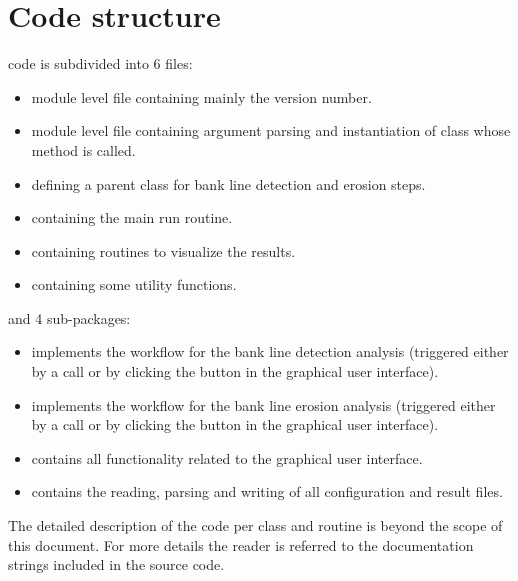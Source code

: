 \chapter{Code structure}

\dfastbe code is subdivided into 6 files:

\begin{itemize}
	\item {} module level file containing mainly the version number.
	\item {} module level file containing argument parsing and instantiation of
	 class whose  method is called.
	\item {} defining a parent  class for bank line detection and erosion steps.
	\item {} containing the main run routine.
	\item {} containing routines to visualize the results.
	\item {} containing some utility functions.
\end{itemize}

and 4 sub-packages:

\begin{itemize}
	\item {} implements the workflow for the bank line detection analysis (triggered either by a  call or by clicking the  button in the graphical user interface).
	\item {} implements the workflow for the bank line erosion analysis (triggered either by a  call or by clicking the  button in the graphical user interface).
	\item {} contains all functionality related to the graphical user interface.
	\item {} contains the reading, parsing and writing of all configuration and result files.
\end{itemize}

The detailed description of the code per class and routine is beyond the scope of this document.
For more details the reader is referred to the documentation strings included in the source code.
